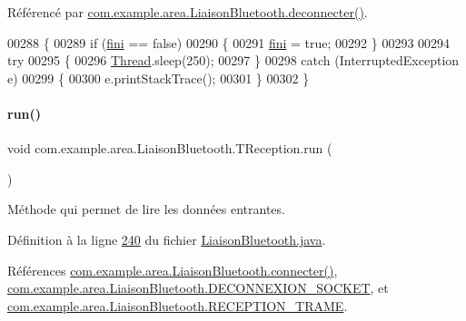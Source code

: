 Référencé par \hyperlink{_liaison_bluetooth_8java_source_l00171}{com.\+example.\+area.\+Liaison\+Bluetooth.\+deconnecter()}.


\begin{DoxyCode}
00288         \{
00289             \textcolor{keywordflow}{if} (\hyperlink{classcom_1_1example_1_1area_1_1_liaison_bluetooth_1_1_t_reception_a7f942e7af3e97af754f2591d2bd20435}{fini} == \textcolor{keyword}{false})
00290             \{
00291                 \hyperlink{classcom_1_1example_1_1area_1_1_liaison_bluetooth_1_1_t_reception_a7f942e7af3e97af754f2591d2bd20435}{fini} = \textcolor{keyword}{true};
00292             \}
00293 
00294             \textcolor{keywordflow}{try}
00295             \{
00296                 \hyperlink{class_thread}{Thread}.sleep(250);
00297             \}
00298             \textcolor{keywordflow}{catch} (InterruptedException e)
00299             \{
00300                 e.printStackTrace();
00301             \}
00302         \}
\end{DoxyCode}
\mbox{\label{classcom_1_1example_1_1area_1_1_liaison_bluetooth_1_1_t_reception_afb141736dac915d0c82f96f75033f318}} 
\paragraph{\texorpdfstring{run()}{run()}}
{\footnotesize\ttfamily void com.\+example.\+area.\+Liaison\+Bluetooth.\+T\+Reception.\+run (\begin{DoxyParamCaption}{ }\end{DoxyParamCaption})}



Méthode qui permet de lire les données entrantes. 



Définition à la ligne \hyperlink{_liaison_bluetooth_8java_source_l00240}{240} du fichier \hyperlink{_liaison_bluetooth_8java_source}{Liaison\+Bluetooth.\+java}.



Références \hyperlink{_liaison_bluetooth_8java_source_l00136}{com.\+example.\+area.\+Liaison\+Bluetooth.\+connecter()}, \hyperlink{_liaison_bluetooth_8java_source_l00037}{com.\+example.\+area.\+Liaison\+Bluetooth.\+D\+E\+C\+O\+N\+N\+E\+X\+I\+O\+N\+\_\+\+S\+O\+C\+K\+ET}, et \hyperlink{_liaison_bluetooth_8java_source_l00038}{com.\+example.\+area.\+Liaison\+Bluetooth.\+R\+E\+C\+E\+P\+T\+I\+O\+N\+\_\+\+T\+R\+A\+ME}.


